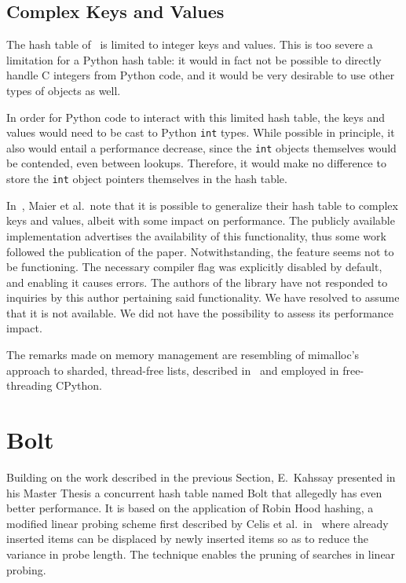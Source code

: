 \subsection{Complex Keys and Values}\label{subsec:maier-complex-keys-and-values}

The hash table of~\cite{maier} is limited to integer keys and values.
This is too severe a limitation for a Python hash table: it would in fact not be possible to directly handle C integers from Python code, and it would be very desirable to use other types of objects as well.

In order for Python code to interact with this limited hash table, the keys and values would need to be cast to Python \texttt{int} types.
While possible in principle, it also would entail a performance decrease, since the \texttt{int} objects themselves would be contended, even between lookups.
Therefore, it would make no difference to store the \texttt{int} object pointers themselves in the hash table.

In~\cite[\S5.7]{maier}, Maier et al.\ note that it is possible to generalize their hash table to complex keys and values, albeit with some impact on performance.
The publicly available implementation advertises the availability of this functionality, thus some work followed the publication of the paper.
Notwithstanding, the feature seems not to be functioning.
The necessary compiler flag was explicitly disabled by default, and enabling it causes errors.
The authors of the library have not responded to inquiries by this author pertaining said functionality.
We have resolved to assume that it is not available.
We did not have the possibility to assess its performance impact.

The remarks made on memory management are resembling of mimalloc's approach to sharded, thread-free lists, described in~\cite{mimalloc} and employed in free-threading CPython.


\section{Bolt}\label{sec:bolt}

Building on the work described in the previous Section, E.\ Kahssay presented in his Master Thesis a concurrent hash table named Bolt that allegedly has even better performance.
It is based on the application of Robin Hood hashing, a modified linear probing scheme first described by Celis et al.\ in~\cite{robin-hood} where already inserted items can be displaced by newly inserted items so as to reduce the variance in probe length.
The technique enables the pruning of searches in linear probing.

